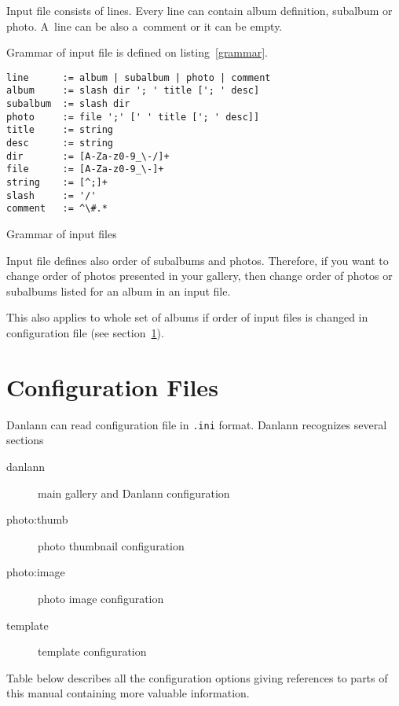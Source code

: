 \documentclass{article}
\begin{document}
Input file consists of lines. Every line can contain album definition,
subalbum or photo. A~line can be also a~comment or it can be empty.

Grammar of input file is defined on listing~\ref{grammar}.

\begin{listing}
\begin{lstlisting}
line      := album | subalbum | photo | comment
album     := slash dir '; ' title ['; ' desc]
subalbum  := slash dir
photo     := file ';' [' ' title ['; ' desc]]
title     := string
desc      := string
dir       := [A-Za-z0-9_\-/]+
file      := [A-Za-z0-9_\-]+
string    := [^;]+
slash     := '/'
comment   := ^\#.*
\end{lstlisting}
\caption{Grammar of input files}\label{grammar}
\end{listing}

Input file defines also order of subalbums and photos. 
Therefore, if you want to change order of photos presented in your gallery, then
change order of photos or subalbums listed for an album in an input file.

This also applies to whole set of albums if order of input files is changed
in configuration file (see section~\ref{conf:all}).

\section{Configuration Files}\label{conf:all}
Danlann can read configuration file in \texttt{.ini} format. Danlann
recognizes several sections
\begin{description}
\item[danlann] main gallery and Danlann configuration
\item[photo:thumb] photo thumbnail configuration
\item[photo:image] photo image configuration
\item[template] template configuration
\end{description}

Table below describes all the configuration options giving references to
parts of this manual containing more valuable information.
\end{document}
